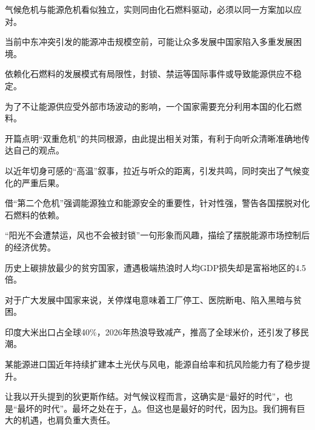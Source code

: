 \documentclass[11pt,a4paper]{ctexart}
\begin{document}
\begin{choices}
\item 气候危机与能源危机看似独立，实则同由化石燃料驱动，必须以同一方案加以应对。
\item 当前中东冲突引发的能源冲击规模空前，可能让众多发展中国家陷入多重发展困境。
\item 依赖化石燃料的发展模式有局限性，封锁、禁运等国际事件或导致能源供应不稳定。
\item 为了不让能源供应受外部市场波动的影响，一个国家需要充分利用本国的化石燃料。
\end{choices}

\begin{choices}
\item 开篇点明“双重危机”的共同根源，由此提出相关对策，有利于向听众清晰准确地传达自己的观点。
\item 以近年切身可感的“高温”叙事，拉近与听众的距离，引发共鸣，同时突出了气候变化的严重后果。
\item 借“第二个危机”强调能源独立和能源安全的重要性，针对性强，警告各国摆脱对化石燃料的依赖。
\item “阳光不会遭禁运，风也不会被封锁”一句形象而风趣，描绘了摆脱能源市场控制后的经济优势。
\end{choices}

\begin{choices}
\item 历史上碳排放最少的贫穷国家，遭遇极端热浪时人均GDP损失却是富裕地区的4.5倍。
\item 对于广大发展中国家来说，关停煤电意味着工厂停工、医院断电、陷入黑暗与贫困。
\item 印度大米出口占全球40\%，2026年热浪导致减产，推高了全球米价，还引发了移民潮。
\item 某能源进口国近年持续扩建本土光伏与风电，能源自给率和抗风险能力有了稳步提升。
\end{choices}


让我以开头提到的狄更斯作结。对气候议程而言，这确实是“最好的时代”，也是“最坏的时代”。最坏之处在于，\underline{\hspace{0.6em}A\hspace{0.6em}}。但这也是最好的时代，因为\underline{\hspace{0.6em}B\hspace{0.6em}}。我们拥有巨大的机遇，也肩负重大责任。
\end{document}

